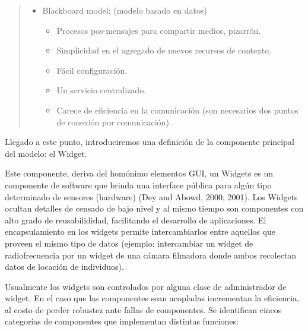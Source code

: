 \begin{quotation}
\begin{itemize}
\item Blackboard model: (modelo basado en datos) 	
	\begin{itemize}
	\item  Procesos pos-mensajes para compartir medios, pizarrón.
	\item Simplicidad en el agregado de nuevos recursos de contexto.
	\item Fácil configuración.
	\item Un servicio centralizado.
	\item Carece de eficiencia en la comunicación (son necesarios dos puntos
	de conexión por comunicación). 
	\end{itemize}

\end{itemize}                                
\end{quotation} 


Llegado a este punto, introduciremos una definición de la componente
principal
del modelo: el Widget.


Este componente, deriva del homónimo elementos GUI, un Widgets es un componente
de software que brinda una interface pública para algún tipo determinado de
sensores
(hardware) (Dey and Abowd, 2000, 2001). Los Widgets ocultan detalles de censado
de
bajo nivel y al mismo tiempo son componentes con alto grado de reusabilididad,
facilitando el desarrollo de aplicaciones. El encapsulamiento en los widgets
permite
intercambiarlos entre aquellos que proveen el mismo tipo de datos (ejemplo:
intercambiar un widget de radiofrecuencia por un widget de una cámara filmadora
donde ambos recolectan datos de locación de individuos).


Usualmente los widgets son controlados por alguna clase de administrador de
widget.
En el caso que las componentes sean acopladas incrementan la eficiencia, al
costo de
perder robustez ante fallas de componentes.
Se identifican cincos categorías de componentes que implementan distintas
funciones:

